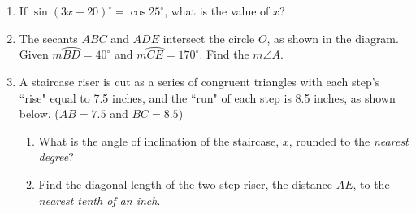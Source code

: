 \documentclass[12pt, twoside]{article}
\begin{document}
\begin{enumerate}
  \item If $\sin (3x+20)^\circ = \cos 25^\circ$, what is the value of $x$? \vspace{3cm}

\newpage
  \item The secants $\overline{ABC}$ and $\overline{ADE}$ intersect the circle $O$, as shown in the diagram. \\Given $m \wideparen{BD}=40^\circ$ and $m \wideparen{CE}=170^\circ$. Find the $m\angle A$.
   \begin{center}
 \end{center} \vspace{1cm}

  \item A staircase riser is cut as a series of congruent triangles with each step's ``rise" equal to 7.5 inches, and the ``run" of each step is 8.5 inches, as shown below. ($AB=7.5$ and $BC=8.5$)
  \begin{enumerate}
    \item What is the angle of inclination of the staircase, $x$, rounded to the \emph{nearest degree}?\\[0.5cm] 
      \item Find the diagonal length of the two-step riser, the distance $AE$, to the \emph{nearest tenth of an inch}.
    \end{enumerate} \vspace{2.5cm}


\end{enumerate}
\end{document}
